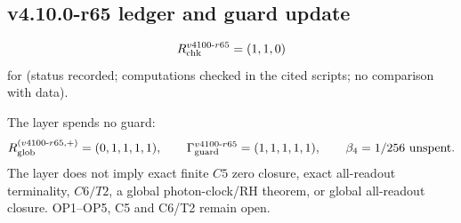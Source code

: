 \subsection*{v4.10.0-r65 ledger and guard update}
\label{subsec:v4100-r65-ledger-guard}

\[
R_{\rm chk}^{v4100\text{-}r65}=(1,1,0)
\]
for (status recorded; computations checked in the cited scripts; no comparison with data).

The layer spends no guard:
\[
R_{\rm glob}^{(v4100\text{-}r65,+)}=(0,1,1,1,1),
\qquad
\Gamma_{\rm guard}^{v4100\text{-}r65}=(1,1,1,1,1),
\qquad
\beta_4=1/256\ \text{unspent}.
\]
The layer does not imply exact finite \(C5\) zero closure, exact all-readout terminality, \(C6/T2\), a global photon-clock/RH theorem,
or global all-readout closure.  OP1--OP5, C5 and C6/T2 remain open.
